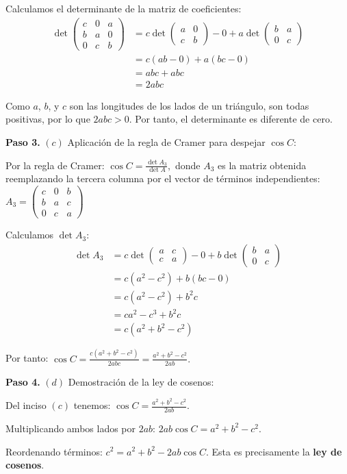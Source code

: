 \begin{example}
\begin{myproof}
Calculamos el determinante de la matriz de coeficientes:
\begin{align*}
\det\begin{pmatrix}
c & 0 & a \\
b & a & 0 \\
0 & c & b
\end{pmatrix} &= c \det\begin{pmatrix} a & 0 \\ c & b \end{pmatrix} - 0 + a \det\begin{pmatrix} b & a \\ 0 & c \end{pmatrix}\\
&= c(ab - 0) + a(bc - 0)\\
&= abc + abc\\
&= 2abc
\end{align*}

Como $a$, $b$, y $c$ son las longitudes de los lados de un triángulo, son todas positivas, por lo que $2abc > 0$. Por tanto, el determinante es diferente de cero.

\textbf{Paso 3.} $(c)$ Aplicación de la regla de Cramer para despejar $\cos C$:

Por la regla de Cramer: $\cos C = \frac{\det A_3}{\det A},$ donde $A_3$ es la matriz obtenida reemplazando la tercera columna por el vector de términos independientes: $A_3 = \begin{pmatrix}
c & 0 & b \\
b & a & c \\
0 & c & a
\end{pmatrix}$

Calculamos $\det A_3$:
\begin{align*}
\det A_3 &= c \det\begin{pmatrix} a & c \\ c & a \end{pmatrix} - 0 + b \det\begin{pmatrix} b & a \\ 0 & c \end{pmatrix}\\
&= c(a^2 - c^2) + b(bc - 0)\\
&= c(a^2 - c^2) + b^2c\\
&= ca^2 - c^3 + b^2c\\
&= c(a^2 + b^2 - c^2)
\end{align*}

Por tanto: $\cos C = \frac{c(a^2 + b^2 - c^2)}{2abc} = \frac{a^2 + b^2 - c^2}{2ab}.$

\textbf{Paso 4.} $(d)$ Demostración de la ley de cosenos:

Del inciso $(c)$ tenemos: $\cos C = \frac{a^2 + b^2 - c^2}{2ab}.$

Multiplicando ambos lados por $2ab$: $2ab\cos C = a^2 + b^2 - c^2.$

Reordenando términos: $\boxed{c^2 = a^2 + b^2 - 2ab\cos C}.$ Esta es precisamente la \textbf{ley de cosenos}.
\end{myproof}
\end{example}

